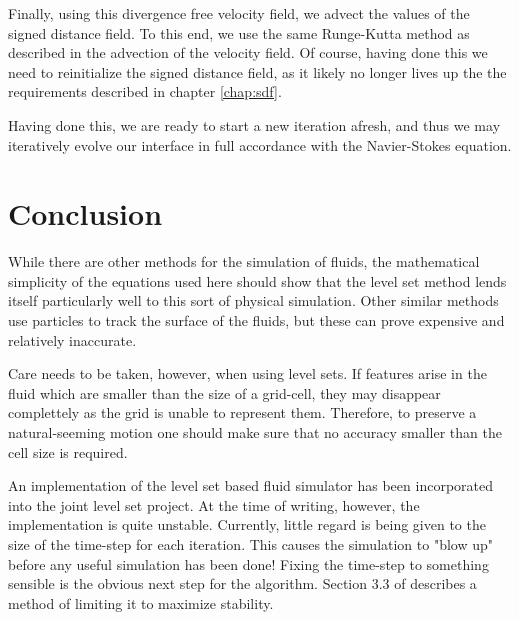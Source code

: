 Finally, using this divergence free velocity field, we advect the values of the signed distance field. To this end, we use the same Runge-Kutta method as described in the advection of the velocity field. Of course, having done this we need to reinitialize the signed distance field, as it likely no longer lives up the the requirements described in chapter \vref{chap:sdf}.

Having done this, we are ready to start a new iteration afresh, and thus we may iteratively evolve our interface in full accordance with the Navier-Stokes equation.

\section{Conclusion}
While there are other methods for the simulation of fluids, the mathematical simplicity of the equations used here should show that the level set method lends itself particularly well to this sort of physical simulation. Other similar methods use particles to track the surface of the fluids, but these can prove expensive and relatively inaccurate.

Care needs to be taken, however, when using level sets. If features arise in the fluid which are smaller than the size of a grid-cell, they may disappear complettely as the grid is unable to represent them. Therefore, to preserve a natural-seeming motion one should make sure that no accuracy smaller than the cell size is required.

An implementation of the level set based fluid simulator has been incorporated into the joint level set project. At the time of writing, however, the implementation is quite unstable. Currently, little regard is being given to the size of the time-step for each iteration. This causes the simulation to "blow up" before any useful simulation has been done! Fixing the time-step to something sensible is the obvious next step for the algorithm. Section 3.3 of  describes a method of limiting it to maximize stability.
